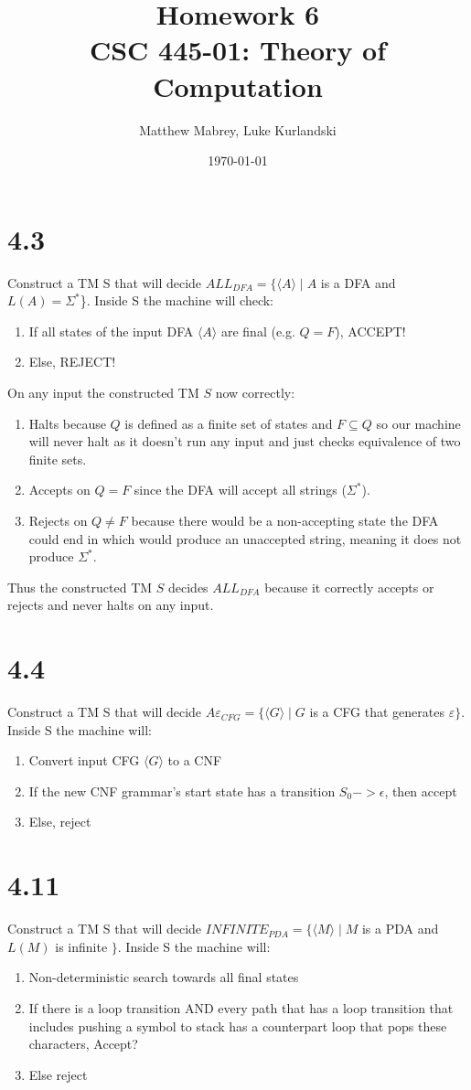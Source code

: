 \documentclass{article}
\title{Homework 6\\[0.2em]\smaller{}CSC 445-01: Theory of Computation}
\author{Matthew Mabrey, Luke Kurlandski}
\date{\today}
\begin{document}
\maketitle

\section*{4.3}
Construct a TM S that will decide $ALL_{DFA} = \{\langle A \rangle \mid A$ is a DFA and $L(A) = \Sigma^*$\}. Inside S the machine will check:
\begin{enumerate}
    \item If all states of the input DFA $\langle A \rangle$ are final (e.g. $Q = F$), ACCEPT! 
    \item Else, REJECT!
\end{enumerate}
On any input the constructed TM $S$ now correctly: 
\begin{enumerate}
    \item Halts because $Q$ is defined as a finite set of states and $F \subseteq Q$ so our machine will never halt as it doesn't run any input and just checks equivalence of two finite sets.
    \item Accepts on $Q = F$ since the DFA will accept all strings ($\Sigma^*$).
    \item Rejects on $Q \neq F$ because there would be a non-accepting state the DFA could end in which would produce an unaccepted string, meaning it does not produce $\Sigma^*$.
\end{enumerate}
Thus the constructed TM $S$ decides $ALL_{DFA}$ because it correctly accepts or rejects and never halts on any input.

\section*{4.4}
Construct a TM S that will decide $A\varepsilon_{CFG} = \{\langle G \rangle \mid G$ is a CFG that generates $\varepsilon\}$. Inside S the machine will:
\begin{enumerate}
    \item Convert input CFG $\langle G \rangle$ to a CNF
    \item If the new CNF grammar's start state has a transition $S_0 -> \epsilon$, then accept
    \item Else, reject
\end{enumerate}

\section*{4.11}
Construct a TM S that will decide $INFINITE_{PDA} = \{\langle M \rangle \mid M$ is a PDA and $L(M)$ is infinite $\}$. Inside S the machine will:
\begin{enumerate}
    \item Non-deterministic search towards all final states
    \item If there is a loop transition AND every path that has a loop transition that includes pushing a symbol to stack has a counterpart loop that pops these characters, Accept?
    \item Else reject
\end{enumerate}
\end{document}
